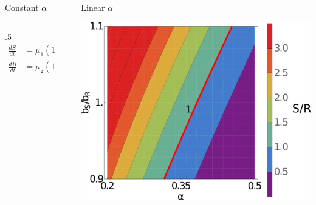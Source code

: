 \documentclass[final]{beamer}
\newlength{\sepwid}
\newlength{\onecolwid}
\newlength{\figwid}
\begin{document}
\begin{frame}[t]
\begin{block}
\begin{columns}[t]
\begin{column}{\onecolwid}
\begin{block}{Constant $\alpha$}
\begin{columns}[t]
\begin{column}{.5\onecolwid}
      \begin{align*}
        \frac{dS}{dt}& = \mu_1 \left(1 - \frac{S + R}{K}\right)S - \alpha S \\[0.5ex]
        \frac{dR}{dt}& = \mu_2 \left(1 - \frac{S + R}{K}\right)R + \alpha S - \delta R
      \end{align*}

      \vspace{.9\baselineskip}
      \vspace{.9\baselineskip}
    \end{column}
  \end{columns}

  \end{block}
\end{column}

\vrule width 5pt
\begin{column}{\sepwid}\end{column} %

\begin{column}{\onecolwid}

  \begin{block}{Linear $\alpha$}
    \begin{center}
      \includegraphics[width=\figwid]{../dev/graphics/poster/linear_contour.pdf}


\end{center}
\end{block}
\end{column}
\end{columns}
\end{block}
\end{frame}
\end{document}
